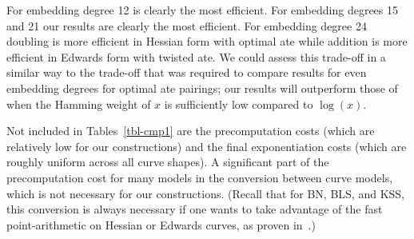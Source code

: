 For embedding degree 12 \cite{2014/LWZ} is clearly the most efficient.
For embedding degrees 15 and 21 our results are clearly the most efficient.
For embedding degree 24 doubling is more efficient in Hessian form with optimal ate
while addition is more efficient in Edwards form with twisted ate. 
We could assess this trade-off in a similar way to the trade-off that was required to compare results for even embedding degrees for optimal ate pairings; 
our results will outperform those of \cite{2014/LWZ} when the Hamming weight of 
$x$ is sufficiently low compared to $\log(x)$.

Not included in Tables~\ref{tbl-cmp1} are the 
precomputation costs (which are relatively low for our constructions) and the final exponentiation costs (which are roughly uniform across all curve shapes).
A significant part of the precomputation cost for many models in the conversion
between curve models, which is not necessary for our constructions.
(Recall that for BN, BLS, and KSS, this conversion is always necessary if one wants to take advantage of
the fast point-arithmetic on Hessian or Edwards curves, as proven in~\cite{2013/bos-pairing}.)


